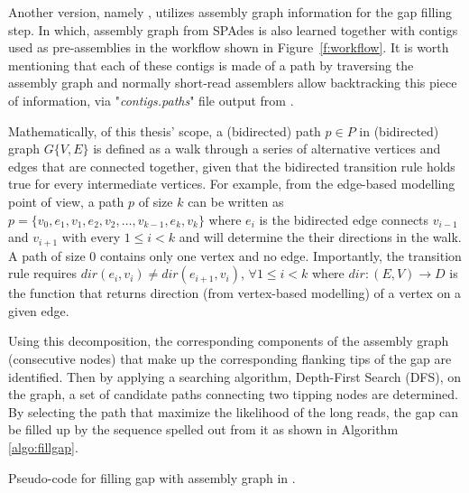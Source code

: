 Another \npscarf{} version, namely \npscarfg{}, utilizes assembly graph information for the gap filling step. In which, assembly graph from SPAdes is also learned together with contigs used as pre-assemblies in the workflow shown in Figure~\ref{f:workflow}. It is worth mentioning that each of these contigs is made of a path by traversing the assembly graph and normally short-read assemblers allow backtracking this piece of information, \EG{} via "\emph{contigs.paths}" file output from \spades{}. 

Mathematically, of this thesis' scope, a (bidirected) path $p\in P$ in (bidirected) graph $G\{V,E\}$ is defined as a walk through a series of alternative vertices and edges that are connected together, given that the bidirected transition rule holds true for every intermediate vertices. For example, from the edge-based modelling point of view, a path $p$ of size $k$ can be written as $p=\{v_0,e_1,v_1,e_2,v_2,\dots,v_{k-1},e_{k},v_k\}$ where $e_i$ is the bidirected edge connects $v_{i-1}$ and $v_{i+1}$ with every $1 \leq i < k$ and will determine the their directions in the walk. A path of size 0 contains only one vertex and no edge.
Importantly, the transition rule requires $dir(e_{i}, v_{i}) \neq dir(e_{i+1}, v_{i})$, $\forall 1 \leq i < k$ where $dir:(E,V)\rightarrow D$ is the function that returns direction (from vertex-based modelling) of a vertex on a given edge.

Using this decomposition, the corresponding components of the assembly graph (consecutive nodes) that make up the corresponding flanking tips of the gap are identified. Then by applying a searching algorithm, \EG{} Depth-First Search (DFS), on the graph, a set of candidate paths connecting two tipping nodes are determined. By selecting the path that maximize the likelihood of the long reads, the gap can be filled up by the sequence spelled out from it as shown in Algorithm \ref{algo:fillgap}. 

\begin{algorithm}[H]
\DontPrintSemicolon
{}
\caption{Pseudo-code for filling gap with assembly graph in .}
\label{algo:fillgap}
\end{algorithm}

